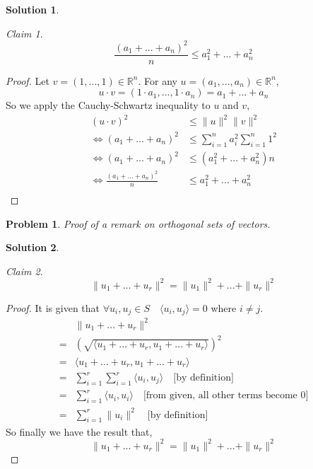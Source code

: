 \documentclass{article}
\newtheorem{problem}{Problem}
\theoremstyle{definition}
\newtheorem*{solution}{Solution}
\theoremstyle{remark}
\newtheorem*{theorem}{Claim}
\begin{document}
\begin{solution}

\begin{theorem}
\[
\frac{(a_1+...+a_n)^2}{n} \leq a_1^2+...+a_n^2
\]
\end{theorem}
\begin{proof}
Let $v=(1,...,1)\in \mathbb{R}^n$.
For any $u=(a_1,...,a_n)\in\mathbb{R}^n$,
\[
u\cdot v=(1\cdot a_1,...,1\cdot a_n)=a_1+...+a_n
\]
So we apply the Cauchy-Schwartz inequality to $u$ and $v$,
\begin{align*}
(u\cdot v)^2 & \leq \|u\|^2 \|v\|^2 \\
\Leftrightarrow (a_1+...+a_n)^2 & \leq \sum_{i=1}^{n} a_i^2 \sum_{i=1}^{n} 1^2 \\
\Leftrightarrow (a_1+...+a_n)^2 & \leq (a_1^2+...+a_n^2) n \\
\Leftrightarrow \frac{(a_1+...+a_n)^2}{n} & \leq a_1^2+...+a_n^2 \\
\end{align*}
\end{proof}

\end{solution}

\begin{problem}

Proof of a remark on orthogonal sets of vectors.

\end{problem}

\begin{solution}

\begin{theorem}
\[
\|u_1+...+u_r\|^2 = \| u_1 \|^2+...+\| u_r \|^2
\]
\end{theorem}
\begin{proof}
It is given that $\forall u_i,u_j\in S \quad \langle u_i, u_j \rangle=0$ where $i\neq j$.
\begin{align*}
  & \|u_1+...+u_r\|^2 \\
= & \left( \sqrt{\langle u_1+...+u_r,u_1+...+u_r \rangle} \right)^2 \\
= & \langle u_1+...+u_r,u_1+...+u_r \rangle \\
= & \sum_{i=1}^{r} \sum_{i=1}^{r} \langle u_i,u_j \rangle \quad \text{[by definition]} \\
= & \sum_{i=1}^{r} \langle u_i,u_i \rangle \quad \text{[from given, all other terms become 0]} \\
= & \sum_{i=1}^{r} \| u_i \|^2 \quad \text{[by definition]}
\end{align*}
So finally we have the result that,
\[
\|u_1+...+u_r\|^2 = \| u_1 \|^2+...+\| u_r \|^2
\]
\end{proof}

\end{solution}
\end{document}

